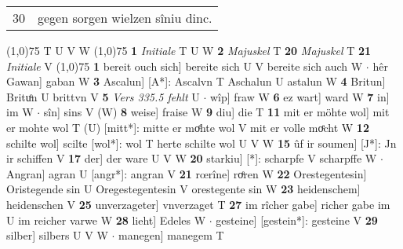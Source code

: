 \documentclass[8pt,a4paper,notitlepage]{article}
\begin{document}
\begin{table}[ht]
\begin{minipage}[t]{0.5\linewidth}
\begin{tabular}{rl}
30 & gegen sorgen wielzen sîniu dinc.\\ 
\end{tabular}
\scriptsize
\line(1,0){75} \newline
T U V W \newline
\line(1,0){75} \newline
\textbf{1} \textit{Initiale} T U W  \textbf{2} \textit{Majuskel} T  \textbf{20} \textit{Majuskel} T  \textbf{21} \textit{Initiale} V  \newline
\line(1,0){75} \newline
\textbf{1} bereit ouch sich] bereite sich U V bereite sich auch W  $\cdot$ hêr Gawan] gaban W \textbf{3} Ascalun] [A*]: Ascalvn T Aschalun U astalun W \textbf{4} Britun] Brituͦn U brittvn V \textbf{5} \textit{Vers 335.5 fehlt} U   $\cdot$ wîp] fraw W \textbf{6} ez wart] ward W \textbf{7} in] im W  $\cdot$ sîn] sins V (W) \textbf{8} weise] fraise W \textbf{9} diu] die T \textbf{11} mit er möhte wol] mit er mohte wol T (U) [mitt*]: mitte er moͤhte wol V mit er volle moͤcht W \textbf{12} schilte wol] scilte [wol*]: wol T herte schilte wol U V W \textbf{15} ûf ir soumen] [J*]: Jn ir schiffen V \textbf{17} der] der ware U V W \textbf{20} starkiu] [*]: scharpfe V scharpffe W  $\cdot$ Angran] agran U [angr*]: angran V \textbf{21} rœrîne] roͤren W \textbf{22} Orestegentesin] Oristegende sin U Oregestegentesin V orestegente sin W \textbf{23} heidenschem] heidenschen V \textbf{25} unverzageter] vnverzaget T \textbf{27} im rîcher gabe] richer gabe im U im reicher varwe W \textbf{28} lieht] Edeles W  $\cdot$ gesteine] [gestein*]: gesteine V \textbf{29} silber] silbers U V W  $\cdot$ manegen] manegem T \newline
\end{minipage}
\end{table}
\end{document}
